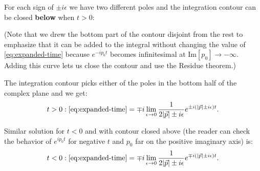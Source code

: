 \documentclass[aps,prd,final,twocolumn,floats,floatfix,nofootinbib,10pt]{revtex4-1}
\begin{document}
For each sign of $\pm i \epsilon$ we have two different poles and the integration contour can be closed
\textbf{below} when $t > 0$:
\begin{center}
\end{center}
(Note that we drew the bottom part of the contour disjoint from the rest to emphasize that it can be added
to the integral without changing the value of \eqref{eq:expanded-time} because $e^{-i p_0 t}$ becomes
infinitesimal at $\text{Im}[p_0] \to -\infty$. Adding this curve lets us close the contour and use the Residue
theorem.)

The integration contour picks either of the poles in the bottom half of the complex plane and we get:
\begin{equation}\label{eq:time-solution-ret}
t > 0 : \eqref{eq:expanded-time} = \mp i \lim_{\epsilon \to 0} \frac{1}{2 |\vec{p}| \pm i \epsilon}
  e^{\pm i \left(|\vec{p}| \pm i \epsilon\right) t}.
\end{equation}

Similar solution for $t < 0$ and with contour closed above (the reader can check the behavior of
$e^{i p_0 t}$ for negative $t$ and $p_0$ far on the positive imaginary axis) is:
\begin{equation}\label{eq:time-solution-adv}
t < 0 : \eqref{eq:expanded-time} = \mp i \lim_{\epsilon \to 0} \frac{1}{2 |\vec{p}| \pm i \epsilon}
  e^{\mp i \left(|\vec{p}| \pm i \epsilon\right) t}.
\end{equation}
\end{document}
